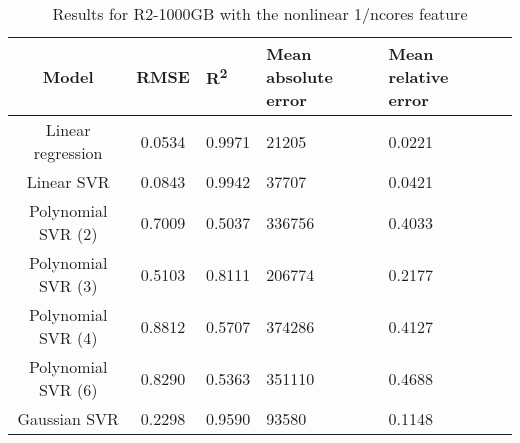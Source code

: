 \begin{table}[H]
\centering
\begin{adjustbox}{center}
\begin{tabular}{c | c M{1.2cm} M{2.5cm} M{2.5cm} M{1.8cm}}
Model & RMSE & R\textsuperscript{2} & Mean absolute error & Mean relative error \tabularnewline
\hline
Linear regression & 0.0534 & 0.9971 &  21205 & 0.0221 \\
Linear SVR & 0.0843 & 0.9942 &  37707 & 0.0421 \\
Polynomial SVR (2) & 0.7009 & 0.5037 & 336756 & 0.4033 \\
Polynomial SVR (3) & 0.5103 & 0.8111 & 206774 & 0.2177 \\
Polynomial SVR (4) & 0.8812 & 0.5707 & 374286 & 0.4127 \\
Polynomial SVR (6) & 0.8290 & 0.5363 & 351110 & 0.4688 \\
Gaussian SVR & 0.2298 & 0.9590 &  93580 & 0.1148 \\
\end{tabular}
\end{adjustbox}
\\
\caption{Results for R2-1000GB with the nonlinear 1/ncores feature}
\label{tab:all_nonlinear_R2_1000}
\end{table}
